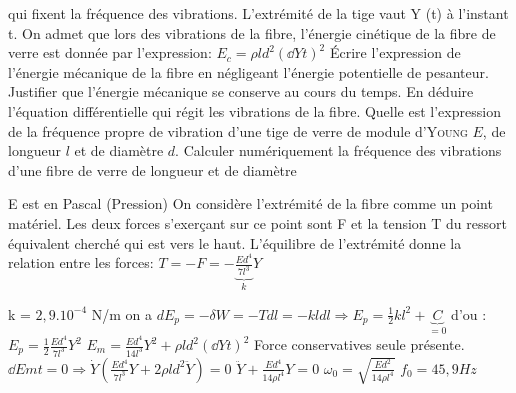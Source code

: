 \begin{Exercise}[title=($*$) Fibre de verre]
  qui fixent la fréquence des vibrations. L’extrémité de la tige vaut Y (t) à
  l’instant t. On admet que lors des vibrations de la fibre, l’énergie cinétique
  de la fibre de verre est donnée par l’expression:
  $E_c = \rho l d^2 \left(\dd{Y}{t}\right)^2$
  \Question Écrire l’expression de l’énergie mécanique de la fibre en négligeant
  l’énergie potentielle de pesanteur.
  \Question Justifier que l’énergie mécanique se conserve au cours du
  temps. En déduire l’équation différentielle qui régit les vibrations de la
  fibre.
  \Question Quelle est l’expression de la fréquence propre de vibration
  d’une tige de verre de module d’\textsc{Young} $E$, de longueur $l$ et de diamètre $d$.
  \Question Calculer numériquement la fréquence des vibrations d’une fibre de
  verre de longueur  et de diamètre 
\end{Exercise}
\begin{Answer}
	\Question E est en Pascal (Pression)
	\Question On considère l’extrémité de la fibre comme un point matériel. Les
    deux forces s’exerçant sur ce point sont F et la tension T du ressort
    équivalent cherché qui est vers le haut. L’équilibre de l’extrémité donne la
    relation entre les forces: $T= -F =- \underbrace{\frac{Ed^4}{7l^3}}_{k}Y $

	\Question k = $2,9.10^{-4}$ N/m
	\Question  on a $dE_p= -\delta W= -T dl = -kldl  \Rightarrow E_p= \frac{1}{2}kl^2 + \underbrace{C}_{=0}$
	d'ou : $E_p = \frac{1}{2}\frac{Ed^4}{7l^3}Y^2$
	\Question $E_m=\frac{Ed^4}{14l^3}Y^2+\rho l d^2 \left(\dd{Y}{t}\right)^2$
	\Question Force conservatives seule présente.
	$\dd{Em}{t}=0 \Rightarrow \dot{Y}\left(\frac{Ed^4}{7l^3}Y+2\rho ld^2 \ddot{Y}\right) =0$
	$\ddot{Y}+\frac{Ed^4}{14\rho l^4}Y=0$
	\Question $\omega_0= \sqrt{\frac{Ed^2}{14\rho l^4}} $
	\Question $f_0=45,9Hz$
\end{Answer}
